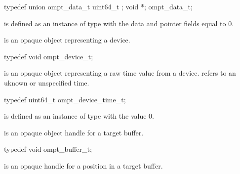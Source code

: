 \begin{ccppspecific}
\begin{omptOther}
typedef union ompt_data_t {
  uint64_t ;
  void *;
} ompt_data_t;
\end{omptOther}
\end{ccppspecific}

 is defined as an instance of type  with the data 
and pointer fields equal to 0.


\label{sec:ompt_device_t}
 is an opaque object representing a device.


\begin{ccppspecific}
\begin{omptOther}
typedef void ompt_device_t;
\end{omptOther}
\end{ccppspecific}





\label{sec:ompt_device_time_t}
 is an opaque object representing a raw time value from a device.
\label{sec:ompt_time_none}
 refers to an uknown or unspecified time.


\begin{ccppspecific}
\begin{omptOther}
typedef uint64_t ompt_device_time_t;
\end{omptOther}
\end{ccppspecific}

 is defined as an instance of type  with 
the value 0.



\label{sec:ompt_buffer_t}
 is an opaque object handle for a target buffer.


\begin{ccppspecific}
\begin{omptOther}
typedef void ompt_buffer_t;
\end{omptOther}
\end{ccppspecific}





\label{sec:ompt_buffer_cursor_t}
 is an opaque handle for a position in a target buffer.


